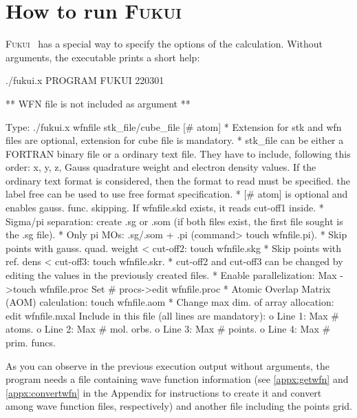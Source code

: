 \documentclass[a4paper,11pt,openany]{memoir}
\newcommand\programa{\textsc{Fukui}}
\begin{document}
\begin{enumerate}

\end{enumerate}


\chapter{How to run \programa}
\programa~ has a special way to specify the options of the calculation. Without arguments, the executable prints a short help:
\begin{consola}{./fukui.x}
PROGRAM FUKUI 220301

** WFN file is not included as argument **

Type: ./fukui.x wfnfile stk_file/cube_file [# atom]
* Extension for stk and wfn files are optional, extension for cube file is mandatory.
* stk_file can be either a FORTRAN binary file or a ordinary text file.
They have to include, following this order: x, y, z, Gauss quadrature
weight and electron density values.
If the ordinary text format is considered, then the format to read must
be specified. the label free can be used to use free format specification.
* [# atom] is optional and enables gauss. func. skipping.
If wfnfile.skd exists, it reads cut-off1 inside.
* Sigma/pi separation: create .sg or .som (if both files exist, the first file sought is the .sg file).
* Only pi MOs: .sg/.som + .pi (command> touch wfnfile.pi).
* Skip points with gauss. quad. weight < cut-off2: touch wfnfile.skg
* Skip points with ref. dens < cut-off3: touch wfnfile.skr.
* cut-off2 and cut-off3 can be changed by editing the values in the
previously created files.
* Enable parallelization: Max        ->touch wfnfile.proc
Set # procs->edit  wfnfile.proc
* Atomic Overlap Matrix (AOM) calculation: touch wfnfile.aom
* Change max dim. of array allocation: edit  wfnfile.mxal
Include in this file (all lines are mandatory):
o Line 1: Max # atoms.
o Line 2: Max #    mol. orbs.
o Line 3: Max # points.
o Line 4: Max # prim. funcs.
\end{consola}
As you can observe in the previous execution output without arguments, the program needs a file containing wave function information (see \autoref{appx:getwfn} and \autoref{appx:convertwfn} in the Appendix for instructions to create it and convert among wave function files, respectively) and another file including the points grid.
\end{document}

